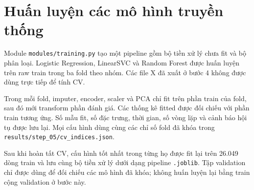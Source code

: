 \section{Huấn luyện các mô hình truyền thống}
\label{sec:4_5}
Module \texttt{modules/training.py} tạo một pipeline gồm bộ tiền xử lý chưa fit và bộ phân loại. Logistic Regression, LinearSVC và Random Forest được huấn luyện trên raw train trong ba fold theo nhóm. Các file X đã xuất ở bước 4 không được dùng trực tiếp để tính CV.

Trong mỗi fold, imputer, encoder, scaler và PCA chỉ fit trên phần train của fold, sau đó mới transform phần đánh giá. Các thống kê fitted được đối chiếu với phần train tương ứng. Số mẫu fit, số đặc trưng, thời gian, số vòng lặp và cảnh báo hội tụ được lưu lại. Mọi cấu hình dùng cùng các chỉ số fold đã khóa trong \texttt{results/step\_05/cv\_indices.json}.

Sau khi hoàn tất CV, cấu hình tốt nhất trong từng họ được fit lại trên 26.049 dòng train và lưu cùng bộ tiền xử lý dưới dạng pipeline \texttt{.joblib}. Tập validation chỉ được dùng để đối chiếu các mô hình đã khóa; không huấn luyện lại bằng train cộng validation ở bước này.
